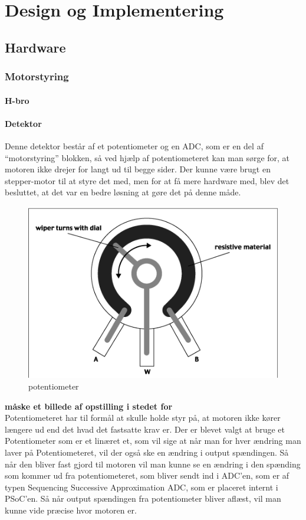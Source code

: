 \chapter{Design og Implementering}

\section{Hardware}

\subsection{Motorstyring}
\subsubsection{H-bro}
\subsubsection{Detektor}
Denne detektor består af et potentiometer og en ADC, som er en del af “motorstyring” blokken, så ved hjælp af potentiometeret kan man sørge for, at motoren ikke drejer for langt ud til begge sider.  Der kunne være brugt en stepper-motor til at styre det med, men for at få mere hardware med, blev det besluttet, at det var en bedre løsning at gøre det på denne måde.
\begin{figure}[H]
	\centering
	\includegraphics[width=\textwidth]{Afsnit/DesignOgImplementering/images/poten}
	\caption{potentiometer}
	\label{fig:poten}
\end{figure}
\textbf{måske et billede af opstilling i stedet for}\\
Potentiometeret har til formål at skulle holde styr på, at motoren ikke kører længere ud end det hvad det fastsatte krav er. Der er blevet valgt at bruge et Potentiometer som er et linæret et, som vil sige at når man for hver ændring man laver på Potentiometeret, vil der også ske en ændring i output spændingen. Så når den bliver fast gjord til motoren vil man kunne se en ændring i den spænding som kommer ud fra potentiometeret, som bliver sendt ind i ADC’en, som er af typen Sequencing Successive Approximation ADC, som er placeret internt i PSoC’en. Så når output spændingen fra potentiometer bliver aflæst, vil man kunne vide præcise hvor motoren er.  
